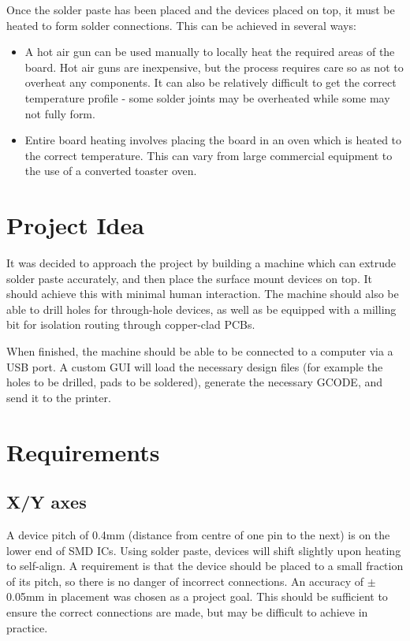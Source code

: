 Once the solder paste has been placed and the devices placed on top, it must be heated to form solder connections. This can be achieved in several ways:

\begin{itemize}
			\item	A hot air gun can be used manually to locally heat the required areas of the board. Hot air guns are inexpensive, but the process requires care so as not to overheat any
					components. It can also be relatively difficult to get the correct temperature profile - some solder joints may be overheated while some may not fully form.
			\item	Entire board heating involves placing the board in an oven which is heated to the correct temperature. This can vary from large commercial equipment to the use of a
					converted toaster oven.
\end{itemize}
			
\section{Project Idea}
It was decided to approach the project by building a machine which can extrude solder paste accurately, and then place
the surface mount devices on top. It should achieve this with minimal human interaction. The machine should also be able to
drill holes for through-hole devices, as well as be equipped with a milling bit for isolation routing through copper-clad PCBs.

\parskip 0.18in

When finished, the machine should be able to be connected to a computer via a USB port. A custom GUI will load the necessary 
design files (for example the holes to be drilled, pads to be soldered), generate the necessary GCODE, and send it to the printer.

\section{Requirements}

\subsection{X/Y axes}
A device pitch of 0.4mm (distance from centre of one pin to the next) is on the lower end of SMD ICs. Using solder paste,
devices will shift slightly upon heating to self-align. A requirement is that the device should be placed to a
small fraction of its pitch, so there is no danger of incorrect connections. An accuracy of $\pm$ 0.05mm
in placement was chosen as a project goal. This should be sufficient to ensure the correct connections are made, but may be difficult to achieve in practice.

